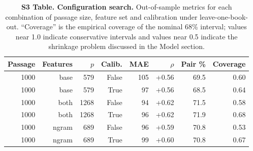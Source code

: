 \begin{table}[!ht]
\centering
\footnotesize
\caption{{\bf S3 Table. Configuration search.}  Out-of-sample metrics for each combination of passage size, feature set and calibration under leave-one-book-out.  ``Coverage'' is the empirical coverage of the nominal 68\% interval; values near 1.0 indicate conservative intervals and values near 0.5 indicate the shrinkage problem discussed in the Model section.}
\label{tab:s3}
\begin{tabular}{rrrrrrrr}
\toprule
\textbf{Passage} & \textbf{Features} & \textbf{$p$} & \textbf{Calib.} & \textbf{MAE} & \textbf{$\rho$} & \textbf{Pair \%} & \textbf{Coverage} \\
\midrule
1000 & base & 579 & False & 105 & +0.56 & 69.5 & 0.60 \\
1000 & base & 579 & True & 97 & +0.56 & 68.5 & 0.64 \\
1000 & both & 1268 & False & 94 & +0.62 & 71.5 & 0.58 \\
1000 & both & 1268 & True & 96 & +0.62 & 71.9 & 0.68 \\
1000 & ngram & 689 & False & 96 & +0.59 & 70.8 & 0.53 \\
1000 & ngram & 689 & True & 99 & +0.60 & 70.8 & 0.67 \\
\bottomrule
\end{tabular}
\end{table}
